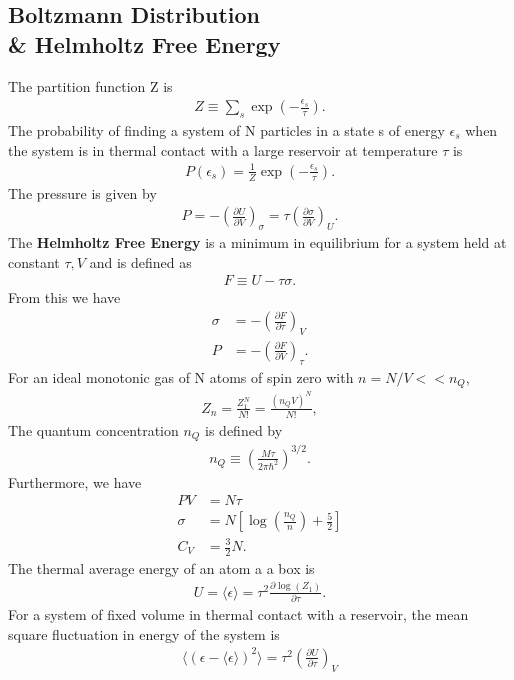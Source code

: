\begin{multicols}{2}
	\section{Boltzmann Distribution\\ \& Helmholtz Free Energy}
	The partition function Z is
	\begin{align}
		Z \equiv \sum_{s} \exp\left(-\frac{\epsilon_s}{\tau}\right).
	\end{align}
	The probability of finding a system of N particles in a state s of energy $\epsilon_s$ when the system is in thermal contact with a large reservoir at temperature $\tau$ is
	\begin{align}
		P(\epsilon_s) = \frac{1}{Z}\exp\left(-\frac{\epsilon_s}{\tau}\right).
	\end{align} 
	The pressure is given by
	\begin{align}
		P = -\left(\frac{\partial U}{\partial V}\right)_\sigma = \tau\left(\frac{\partial \sigma}{\partial V}\right)_U.
	\end{align}
	The \textbf{Helmholtz Free Energy} is a minimum in equilibrium for a system held at constant $\tau, V$ and is defined as
	\begin{align}
		F\equiv U-\tau \sigma.	
	\end{align}
	From this we have
	\begin{align}
		\sigma &= -\left(\frac{\partial F}{\partial \tau}\right)_V \\
		P &= -\left(\frac{\partial F}{\partial V}\right)_\tau.
	\end{align}
	For an ideal monotonic gas of N atoms of spin zero with $n=N/V << n_Q$,
	\begin{align}
		Z_n = \frac{Z_1^N}{N!}=\frac{(n_Q V)^N}{N!},
	\end{align}
	The quantum concentration $n_Q$ is defined by
	\begin{align}
		n_Q \equiv \left(\frac{M\tau}{2\pi\hbar^2}\right)^{3/2}.
	\end{align}
	Furthermore, we have
	\begin{align}
		PV&=N\tau \\
		\sigma &=N\left[\log\left(\frac{n_Q}{n}\right)+\frac{5}{2}\right] \\
		C_V&=\frac{3}{2}N.  
	\end{align}
	The thermal average energy of an atom a a box is
	\begin{align}
		U = \langle \epsilon \rangle = \tau^2 \frac{\partial \log (Z_1)}{\partial \tau}.
	\end{align}
	For a system of fixed volume in thermal contact with a reservoir, the mean square fluctuation in energy of the system is
	\begin{align}
		\langle(\epsilon - 	\langle\epsilon \rangle)^2 \rangle = \tau^2\left(\frac{\partial U}{\partial \tau}\right)_V
	\end{align}  
\end{multicols}